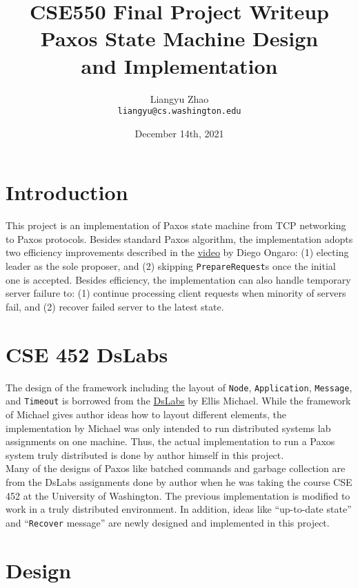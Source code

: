 \documentclass{article}
\author{Liangyu Zhao \\ \texttt{liangyu@cs.washington.edu}}
\date{December 14th, 2021}
\title{%
CSE550 Final Project Writeup \\
\large Paxos State Machine Design \\
and Implementation}
\numberwithin{equation}{section}
\begin{document}
\maketitle

\newpage

\tableofcontents

\newpage

\section{Introduction}

This project is an implementation of Paxos state machine from TCP networking to Paxos protocols. Besides standard Paxos algorithm, the implementation adopts two efficiency improvements described in the \href{https://youtu.be/JEpsBg0AO6o?t=2615}{video} by Diego Ongaro: (1) electing leader as the sole proposer, and (2) skipping \verb|PrepareRequest|s once the initial one is accepted. Besides efficiency, the implementation can also handle temporary server failure to: (1) continue processing client requests when minority of servers fail, and (2) recover failed server to the latest state.

\section{CSE 452 DsLabs}

The design of the framework including the layout of \verb|Node|, \verb|Application|, \verb|Message|, and \verb|Timeout| is borrowed from the \href{https://github.com/emichael/dslabs}{DsLabs} by Ellis Michael. While the framework of Michael gives author ideas how to layout different elements, the implementation by Michael was only intended to run distributed systems lab assignments on one machine. Thus, the actual implementation to run a Paxos system truly distributed is done by author himself in this project.\\

Many of the designs of Paxos like batched commands and garbage collection are from the DsLabs assignments done by author when he was taking the course CSE 452 at the University of Washington. The previous implementation is modified to work in a truly distributed environment. In addition, ideas like ``up-to-date state'' and ``\verb|Recover| message'' are newly designed and implemented in this project.

\section{Design}
\end{document}
